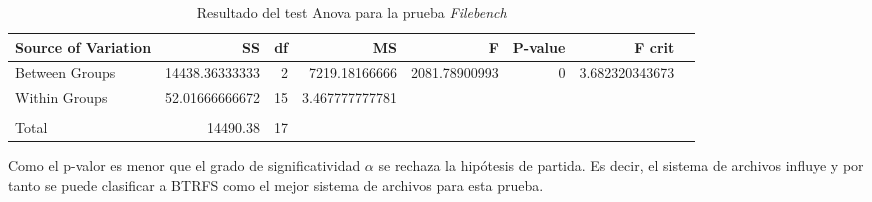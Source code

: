 \begin{table}[H]\centering

\scriptsize
\begin{tabular}{lrrrrrrr}\toprule
Source of Variation &SS &df &MS &F &P-value &F crit \\\midrule
Between Groups &14438.36333333 &2 &7219.18166666 &2081.78900993 &0 &3.682320343673 \\
Within Groups &52.01666666672 &15 &3.467777777781 & & & \\
& & & & & & \\
Total &14490.38 &17 & & & & \\
\bottomrule
\end{tabular}
\caption{Resultado del test Anova para la prueba \textit{Filebench}}\label{tab: }
\end{table}

Como el p-valor es menor que el grado de significatividad $\alpha$ se rechaza la hipótesis de partida. Es decir, el sistema de archivos influye y por tanto se puede clasificar a BTRFS como el mejor sistema de archivos para esta prueba.

